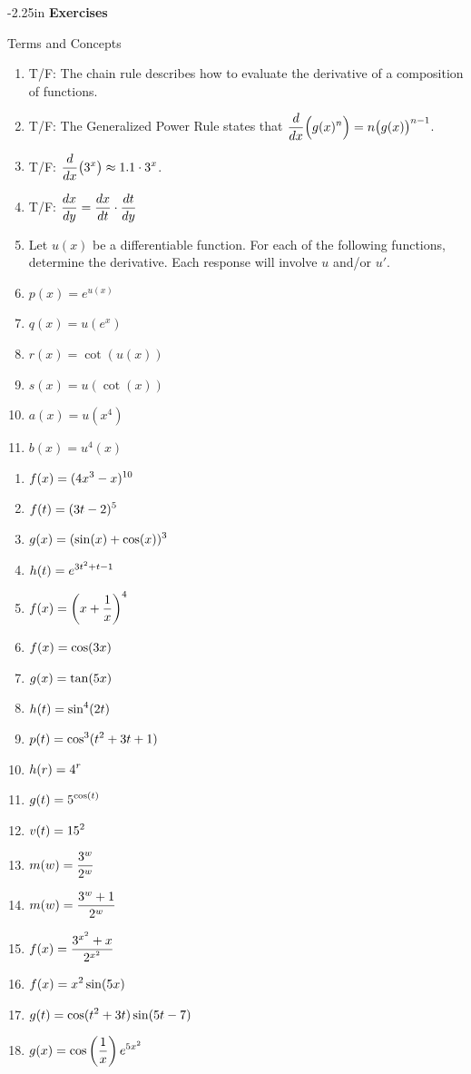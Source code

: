 \begin{adjustwidth*}{}{-2.25in}
\textbf{{\large Exercises}}
\setlength{\columnsep}{25pt}
\begin{multicols*}{2}
\noindent Terms and Concepts \small
\begin{enumerate}[1)]
\item T/F: The chain rule describes how to evaluate the derivative of a composition of functions.
\item T/F: The Generalized Power Rule states that $\displaystyle \frac{d}{dx}\Big( g(x)^n\Big) = n\big(g(x)\big)^{n-1}$.
\item T/F: $\displaystyle \frac{d}{dx}\big(3^x\big) \approx 1.1\cdot3^x$.
\item T/F: $\displaystyle \frac{dx}{dy} = \frac{dx}{dt}\cdot \frac{dt}{dy}$
\item Let $u(x)$ be a differentiable function.  For each of the following functions, determine the derivative.  Each response will involve $u$ and/or $u'$.
\ba
	\item $p(x) = e^{u(x)}$
	\item $q(x) = u(e^x)$
	\item $r(x) = \cot(u(x))$
	\item $s(x) = u(\cot(x))$
	\item $a(x) = u(x^4)$
	\item $b(x) = u^4(x)$
\ea
\end{enumerate} 

 \small


\begin{enumerate}[1),resume]
\item $\displaystyle f(x) = (4x^3 - x)^{10}$
\item $\displaystyle f(t) = (3t-2)^5$
\item $\displaystyle g(x) = (\sin(x) + \cos(x))^3$
\item $\displaystyle h(t) = e^{3t^2 + t -1}$
\item $\displaystyle f(x) = \left( x + \frac{1}{x} \right)^4$
\item $\displaystyle f(x) = \cos(3x)$
\item $\displaystyle g(x) = \tan(5x)$
\item $\displaystyle h(t) = \sin^4(2t)$
\item $\displaystyle p(t) = \cos^3(t^2 + 3t + 1)$
\item $\displaystyle h(r) = 4^r$
\item $\displaystyle g(t) = 5^{\cos(t)}$
\item $\displaystyle v(t) = 15^2$
\item $\displaystyle m(w) = \frac{3^w}{2^w}$
\item $\displaystyle m(w) = \frac{3^w + 1}{2^w}$
\item $\displaystyle f(x) = \frac{3^{x^2} + x}{2^{x^2}}$
\item $\displaystyle f(x) = x^2 \sin(5x)$
\item $\displaystyle g(t) = \cos(t^2 + 3t) \sin(5t - 7)$
\item $\displaystyle g(x) = \cos\left( \frac{1}{x} \right) e^{5x^2}$
\end{enumerate}


\end{multicols*}
\end{adjustwidth*}
